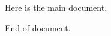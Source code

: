 \documentclass{article}
\begin{document}
Here is the main document.



End of document.
\end{document}

